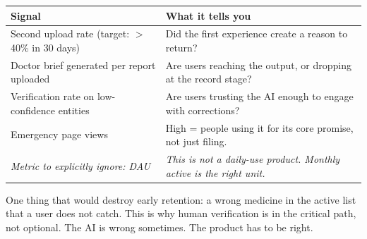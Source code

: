 \documentclass[11pt, a4paper]{article}
\begin{document}
\vspace{4pt}
\begin{tabularx}{\linewidth}{@{}L{7cm} X@{}}
\toprule
\textbf{Signal} & \textbf{What it tells you} \\
\midrule
Second upload rate (target: $>$40\% in 30 days) & Did the first experience create a reason to return? \\
Doctor brief generated per report uploaded & Are users reaching the output, or dropping at the record stage? \\
Verification rate on low-confidence entities & Are users trusting the AI enough to engage with corrections? \\
Emergency page views & High = people using it for its core promise, not just filing. \\
\midrule
\textit{Metric to explicitly ignore: DAU} & \textit{This is not a daily-use product. Monthly active is the right unit.} \\
\bottomrule
\end{tabularx}

\vspace{8pt}

One thing that would destroy early retention: a wrong medicine in the active list that a user does not catch. This is why human verification is in the critical path, not optional. The AI is wrong sometimes. The product has to be right.
\end{document}
